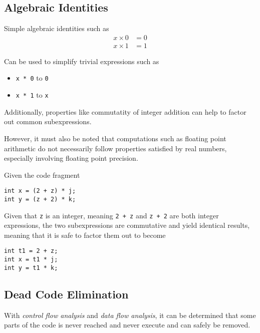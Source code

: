 \subsection{Algebraic Identities}

\begin{definition}
    Simple algebraic identities such as
    \begin{align}
        x \times 0 &= 0 \\
        x \times 1 &= 1
    \end{align}
    
    Can be used to simplify trivial expressions such as
    \begin{itemize}
        \item \texttt{x * 0} to \texttt{0}
        \item \texttt{x * 1} to \texttt{x}
    \end{itemize}
    
    Additionally, properties like commutatity of integer addition can help to factor out common subexpressions.
    
    However, it must also be noted that computations such as floating point arithmetic do not necessarily follow properties satisfied by real numbers, especially involving floating point precision.
\end{definition}

\begin{example}
    Given the code fragment
    \begin{verbatim}
int x = (2 + z) * j;
int y = (z + 2) * k;
    \end{verbatim}
    
    Given that \texttt{z} is an integer, meaning \texttt{2 + z} and \texttt{z + 2} are both integer expressions, the two subexpressions are commutative and yield identical results, meaning that it is safe to factor them out to become
    \begin{verbatim}
int t1 = 2 + z;
int x = t1 * j;
int y = t1 * k;
    \end{verbatim}
\end{example}

\subsection{Dead Code Elimination}

\begin{definition}
    With \textit{control flow analysis} and \textit{data flow analysis}, it can be determined that some parts of the code is never reached and never execute and can safely be removed.
\end{definition}

